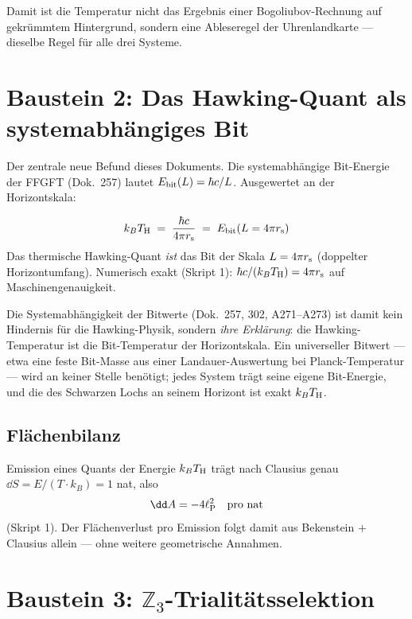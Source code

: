 Damit ist die Temperatur nicht das Ergebnis einer Bogoliubov-Rechnung
auf gekrümmtem Hintergrund, sondern eine Ableseregel der
Uhrenlandkarte — dieselbe Regel für alle drei Systeme.

\section{Baustein 2: Das Hawking-Quant als systemabhängiges Bit}

Der zentrale neue Befund dieses Dokuments. Die systemabhängige
Bit-Energie der FFGFT (Dok.\ 257) lautet $E_{\mathrm{bit}}(L) = \hbar c/L$.
Ausgewertet an der Horizontskala:

\begin{tcolorbox}[ffgftbox, title={Kernresultat \K}]
  \begin{equation}
    k_B T_{\mathrm{H}} \;=\; \frac{\hbar c}{4\pi r_{\mathrm{s}}}
    \;=\; E_{\mathrm{bit}}\!\left(L = 4\pi r_{\mathrm{s}}\right)
  \end{equation}
  Das thermische Hawking-Quant \emph{ist} das Bit der Skala
  $L = 4\pi r_{\mathrm{s}}$ (doppelter Horizontumfang).
  Numerisch exakt (Skript 1): $\hbar c/(k_BT_{\mathrm{H}}) = 4\pi r_{\mathrm{s}}$ auf
  Maschinengenauigkeit.
\end{tcolorbox}

Die Systemabhängigkeit der Bitwerte (Dok.\ 257, 302, A271–A273)
ist damit kein Hindernis für die Hawking-Physik, sondern
\emph{ihre Erklärung}: die Hawking-Temperatur ist die Bit-Temperatur
der Horizontskala. Ein universeller Bitwert — etwa eine feste
Bit-Masse aus einer Landauer-Auswertung bei Planck-Temperatur —
wird an keiner Stelle benötigt; jedes System trägt seine eigene
Bit-Energie, und die des Schwarzen Lochs an seinem Horizont ist
exakt $k_BT_{\mathrm{H}}$.

\subsection{Flächenbilanz}

Emission eines Quants der Energie $k_BT_{\mathrm{H}}$ trägt nach Clausius
genau $\dd S = E/(T\cdot k_B) = 1$ nat, also
\begin{equation}
  \dd A = -4\lP^2 \quad\text{pro nat}
\end{equation}
(Skript 1). Der Flächenverlust pro Emission folgt damit aus
Bekenstein $+$ Clausius allein — ohne weitere geometrische Annahmen. \B

\section{Baustein 3: \texorpdfstring{$\mathbb{Z}_3$}{Z3}-Trialitätsselektion}


